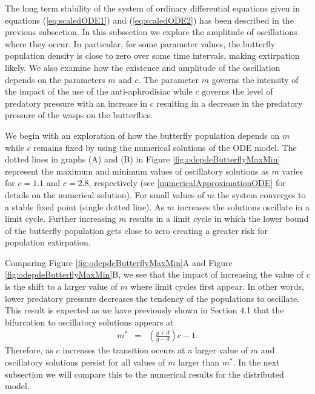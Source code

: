 \documentclass[review,authoryear]{elsarticle}
\newcommand{\origC}{{c}}
\newcommand{\origM}{m}
\begin{document}
The long term stability of the system of ordinary differential equations given in 
equations (\ref{eq:scaledODE1}) and (\ref{eq:scaledODE2}) has been described in the previous subsection. In this subsection we explore the amplitude of oscillations where they occur. In particular, for some parameter values, the butterfly population density is close to zero over some time intervals, making extirpation likely. We also examine how the existence and amplitude of the oscillation depends on the parameters $\origM$ and $c$. The parameter $\origM$ governs the intensity of the impact of the use of the anti-aphrodisiac while $c$ governs the level of predatory pressure with an increase in $c$ resulting in a decrease in the predatory pressure of the wasps on the butterflies.



We begin with an exploration of how the butterfly population depends on $\origM$ while $\origC$ remains fixed by using the numerical solutions of the ODE model.
The dotted lines in graphs (A) and (B) in Figure \ref{fig:odepdeButterflyMaxMin} represent the maximum and minimum values of oscillatory solutions as $\origM$ varies  for $c=1.1$ and  $c=2.8$, respectively  (see  \ref{numericalApproximationODE} for details on the numerical solution). For small values of $\origM$ the system converges to a stable fixed point (single dotted line). As $\origM$
increases the solutions oscillate in a limit cycle. Further increasing $\origM$ results in a limit cycle in which the lower bound of the butterfly population gets close to zero creating a greater risk for population extirpation.


Comparing Figure \ref{fig:odepdeButterflyMaxMin}A and Figure \ref{fig:odepdeButterflyMaxMin}B, we see that the impact of increasing the value of $c$ is the shift to a larger value of $\origM$ where limit cycles first appear. In other words, lower predatory pressure decreases the tendency of the populations to oscillate.
This result is expected as we have previously shown in Section 4.1 that the bifurcation to oscillatory solutions appears at 
\begin{eqnarray}
\label{eqn:transitionLocation}
\origM^* & = & \left(\frac{g+d}{g-d}\right)c -1.
\end{eqnarray}
Therefore, as $c$ increases the transition  occurs at a larger value of $\origM$ and oscillatory solutions persist for all values of $\origM$ larger than $\origM^*$. In the next subsection we will compare this to the numerical results for the distributed model.
\end{document}
